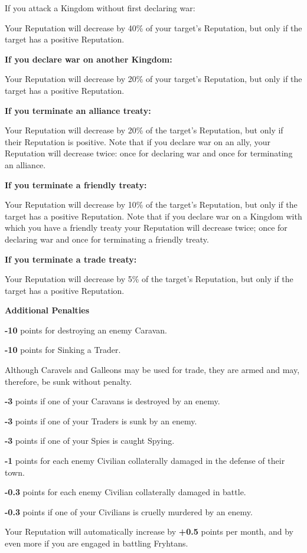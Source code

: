 \begin{changemargin}{.5cm}{0cm}
If you attack a Kingdom without first declaring war:

Your Reputation will decrease by 40\% of your target’s Reputation, but only if the target has a positive Reputation.

\textbf{If you declare war on another Kingdom:}

Your Reputation will decrease by 20\% of your target’s Reputation, but only if the target has a positive Reputation.

\textbf{If you terminate an alliance treaty:}

Your Reputation will decrease by 20\% of the target’s Reputation, but only if their Reputation is positive. Note that if you declare war on an ally, your Reputation will decrease twice: once for declaring war and once for terminating an alliance.

\textbf{If you terminate a friendly treaty: }

Your Reputation will decrease by 10\% of the target’s Reputation, but only if the target has a positive Reputation. Note that if you declare war on a Kingdom with which you have a friendly treaty your Reputation will decrease twice; once for declaring war and once for terminating a friendly treaty.

\textbf{If you terminate a trade treaty:}

Your Reputation will decrease by 5\% of the target’s Reputation, but
only if the target has a positive Reputation.

\textbf{Additional Penalties}

\textbf{-10} points for destroying an enemy Caravan.

\textbf{-10} points for Sinking a Trader.


Although Caravels and Galleons may be used for trade, they are armed and may, therefore, be sunk without penalty.

\textbf{-3} points if one of your Caravans is destroyed by an enemy.

\textbf{-3} points if one of your Traders is sunk by an enemy.

\textbf{-3} points if one of your Spies is caught Spying.

\textbf{-1} points for each enemy Civilian collaterally damaged in the defense of their town.

\textbf{-0.3} points for each enemy Civilian collaterally damaged in battle.

\textbf{-0.3} points if one of your Civilians is cruelly murdered by an enemy.

Your Reputation will automatically increase by \textbf{+0.5} points per month, and by even more if you are engaged in battling Fryhtans.
\end{changemargin}

